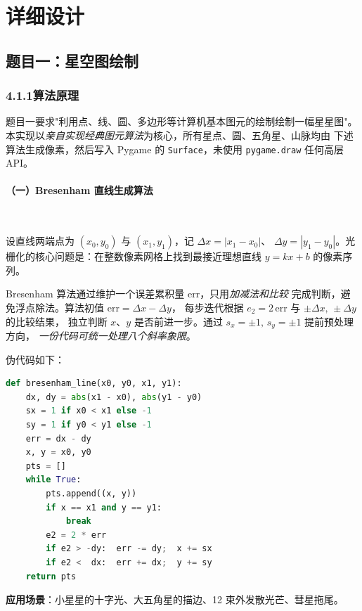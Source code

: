 \documentclass[12pt, a4paper]{article}
\begin{document}
\section{详细设计}\label{sec:four}

\subsection{题目一：星空图绘制}

\subsubsection*{4.1.1\quad 算法原理}

题目一要求"利用点、线、圆、多边形等计算机基本图元的绘制绘制一幅星星图"。
本实现以\textit{亲自实现经典图元算法}为核心，所有星点、圆、五角星、山脉均由
下述算法生成像素，然后写入 Pygame 的 \texttt{Surface}，未使用 \texttt{pygame.draw}
任何高层 API。

\paragraph{（一）Bresenham 直线生成算法}~

设直线两端点为 $(x_0, y_0)$ 与 $(x_1, y_1)$，记 $\Delta x = |x_1 - x_0|$、
$\Delta y = |y_1 - y_0|$。光栅化的核心问题是：在整数像素网格上找到最接近理想直线
$y = kx + b$ 的像素序列。

Bresenham 算法通过维护一个误差累积量 $\mathrm{err}$，只用\textit{加减法和比较}
完成判断，避免浮点除法。算法初值 $\mathrm{err} = \Delta x - \Delta y$，
每步迭代根据 $e_2 = 2\,\mathrm{err}$ 与 $\pm \Delta x,\,\pm \Delta y$ 的比较结果，
独立判断 $x$、$y$ 是否前进一步。通过 $s_x = \pm 1,\,s_y = \pm 1$ 提前预处理方向，
\textit{一份代码可统一处理八个斜率象限}。

伪代码如下：

\begin{lstlisting}[language=Python, caption={Bresenham 直线生成（algorithms.py 摘录）}, label=lst:bresenham]
def bresenham_line(x0, y0, x1, y1):
    dx, dy = abs(x1 - x0), abs(y1 - y0)
    sx = 1 if x0 < x1 else -1
    sy = 1 if y0 < y1 else -1
    err = dx - dy
    x, y = x0, y0
    pts = []
    while True:
        pts.append((x, y))
        if x == x1 and y == y1:
            break
        e2 = 2 * err
        if e2 > -dy:  err -= dy;  x += sx
        if e2 <  dx:  err += dx;  y += sy
    return pts
\end{lstlisting}

\textbf{应用场景}：小星星的十字光、大五角星的描边、12 束外发散光芒、彗星拖尾。
\end{document}
